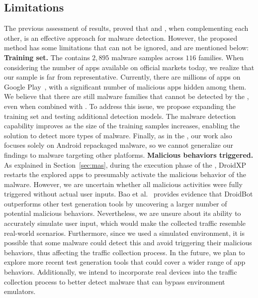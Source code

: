 \subsection{Limitations}\label{sec:limitations}

The previous assessment of results, proved that \mas and \net, when complementing each other, is an effective approach for malware detection. However, the proposed method has some limitations that can not be ignored, and are mentioned below:\newline
\textbf{Training set.} The \cds contains $2,895$ malware samples across $116$ families. When considering the number of apps available on official markets today, we realize that our sample is far from representative. Currently, there are millions of apps on Google Play~\cite{bankmycell}, with a significant number of malicious apps hidden among them. We believe that there are still malware families that cannot be detected by the \mas, even when combined with \net. To address this issue, we propose expanding the training set and testing additional detection models. The malware detection capability improves as the size of the training samples increases, enabling the solution to detect more types of malware. Finally, as in the \fhc, our work also focuses solely on Android repackaged malware, so we cannot generalize our findings to malware targeting other platforms.\newline
\textbf{Malicious behaviors triggered.} As explained in Section~\ref{sec:mas}, during the execution phase of the \fhc, DroidXP restarts the explored apps to presumably activate the malicious behavior of the malware. However, we are uncertain whether all malicious activities were fully triggered without actual user inputs. Bao et al.~\cite{DBLP:conf/wcre/BaoLL18} provides evidence that DroidBot outperforms other test generation tools by uncovering a larger number of potential malicious behaviors. Nevertheless, we are unsure about its ability to accurately simulate user input, which would make the collected traffic resemble real-world scenarios. Furthermore, since we used a simulated environment, it is possible that some malware could detect this and avoid triggering their malicious behaviors, thus affecting the traffic collection process. In the future, we plan to explore more recent test generation tools that could cover a wider range of app behaviors. Additionally, we intend to incorporate real devices into the traffic collection process to better detect malware that can bypass environment emulators.